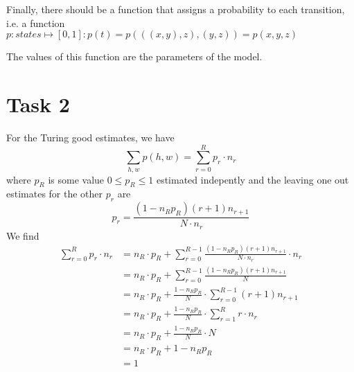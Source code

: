 \documentclass[%
   11pt,              %
   ngerman,           %
   a4paper,           %
   DIV11,             %
]{scrartcl}%
\begin{document}
Finally, there should be a function that assigns a probability to each transition, i.e. a function 
$p: states \mapsto [0,1] : p(t) = p(((x,y),z),(y,z)) = p(x,y,z)$

The values of this function are the parameters of the model. 

\section*{Task 2}
For the Turing good estimates, we have
\begin{equation*}
	\sum_{h,w}p(h,w) = \sum_{r=0}^R p_r\cdot n_r
\end{equation*}
where $p_R$ is some value $0\leq p_R \leq 1$ estimated indepently and the leaving one out estimates for the other $p_r$ are
\begin{equation*}
	p_r = \frac{(1-n_R p_R) (r+1)n_{r+1}}{N\cdot n_r}
\end{equation*}
We find
\begin{align*}
	\sum_{r=0}^R p_r\cdot n_r &= n_R\cdot p_R + \sum_{r=0}^{R-1} \frac{(1-n_R p_R) (r+1)n_{r+1}}{N\cdot n_r} \cdot n_r \\
	&= n_R\cdot p_R + \sum_{r=0}^{R-1} \frac{(1-n_R p_R) (r+1)n_{r+1}}{N} \\
	&= n_R\cdot p_R + \frac{1-n_R p_R}{N} \cdot \sum_{r=0}^{R-1} (r+1)n_{r+1} \\
	&= n_R\cdot p_R + \frac{1-n_R p_R}{N} \cdot \sum_{r=1}^{R} r\cdot n_r \\
	&= n_R\cdot p_R + \frac{1-n_R p_R}{N} \cdot N \\
	&= n_R\cdot p_R + 1-n_R p_R\\
	&= 1
\end{align*}
\end{document}

